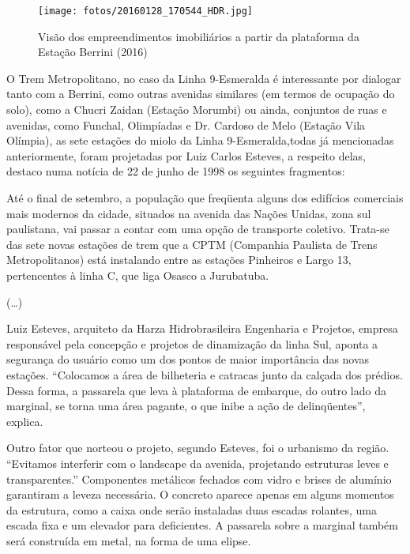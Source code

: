 	\begin{figure}[h]
		\caption{Visão dos empreendimentos imobiliários a partir da plataforma da Estação Berrini (2016)}
		\texttt{[image: fotos/20160128\_170544\_HDR.jpg]}
	\end{figure}
	
	O Trem Metropolitano, no caso da Linha 9-Esmeralda é interessante por dialogar tanto com a Berrini, como outras avenidas similares (em termos de ocupação do solo), como a Chucri Zaidan (Estação Morumbi) ou ainda, conjuntos de ruas e avenidas, como Funchal, Olimpíadas e Dr. Cardoso de Melo (Estação Vila Olímpia), as sete estações do miolo da Linha 9-Esmeralda,todas já mencionadas anteriormente, foram projetadas por Luiz Carlos Esteves, a respeito delas, destaco numa notícia de 22 de junho de 1998 os seguintes fragmentos:
	
	\begin{citacao}
		Até o final de setembro, a população que freqüenta alguns dos edifícios comerciais mais modernos da cidade, situados na avenida das Nações Unidas, zona sul paulistana, vai passar a contar com uma opção de transporte coletivo. Trata-se das sete novas estações de trem que a CPTM (Companhia Paulista de Trens Metropolitanos) está instalando entre as estações Pinheiros e Largo 13, pertencentes à linha C, que liga Osasco a Jurubatuba.
	
		(\dots)
	
		Luiz Esteves, arquiteto da Harza Hidrobrasileira Engenharia e Projetos, empresa responsável pela concepção e projetos de dinamização da linha Sul, aponta a segurança do usuário como um dos pontos de maior importância das novas estações. “Colocamos a área de bilheteria e catracas junto da calçada dos prédios. Dessa forma, a passarela que leva à plataforma de embarque, do outro lado da marginal, se torna uma área pagante, o que inibe a ação de delinqüentes”, explica.
	
		Outro fator que norteou o projeto, segundo Esteves, foi o urbanismo da região. “Evitamos interferir com o landscape da avenida, projetando estruturas leves e transparentes.” Componentes metálicos fechados com vidro e brises de alumínio garantiram a leveza necessária. O concreto aparece apenas em alguns momentos da estrutura, como a caixa onde serão instaladas duas escadas rolantes, uma escada fixa e um elevador para deficientes. A passarela sobre a marginal também será construída em metal, na forma de uma elipse.
		\cite{trembom}
	\end{citacao}
	
